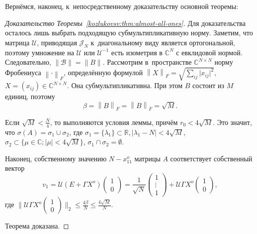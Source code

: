 Верн\"емся, наконец, к~непосредственному доказательству основной теоремы:
\begin{proof}[Доказательство Теоремы~\ref{kozlukovsv:thm:almost-all-ones}]
    Для доказательства осталось лишь выбрать подходящую субмультипликативную норму.
    Заметим, что матрица \( \mathcal{U} \),
    приводящая \( \mathcal{J}_N \) к~диагональному виду
    является ортогональной,
    поэтому умножение на \( \mathcal{U} \) или \(\mathcal{U}^{-1}\)
    есть изометрия в \( \mathbb{C}^N \) с евклидовой нормой.
    Следовательно, \( \|\mathcal{B}\|=\|B\| \).
    Рассмотрим в~пространстве \( \mathbb{C}^{N{\times}N} \)
    норму Фробениуса \( {\left\|\cdot\right\|}_{F} \),
    определ\"енную формулой
    \( {\left\|X\right\|}_{F} = \sqrt{\sum_{ij} \lvert x_{ij}\rvert^2}, \)
    \( X = (x_{ij})\in\mathbb{C}^{N{\times}N} \).
    Она субмультипликативна.
    При этом
    \( B \) состоит из \( M \) единиц, поэтому
    \[
        \beta = {\left\|B\right\|}_{F} =
        {\left\|B\right\|}_{F} = \sqrt{M}.
        \]
    
    Если
     \( \sqrt{M} < \frac{N}{4} \),
     то выполняются условия леммы,
     прич\"ем \( r_0 < 4\sqrt{M} \).
    Это значит, что
     \( \sigma(A) = \sigma_1 \cup \sigma_2 \),
     где \( \sigma_1 = \{ \lambda_1 \}\subset\mathbb{R}, \lvert \lambda_1 - N \rvert < 4\sqrt{M} \),
     \( \sigma_2 \subset \{ \mu\in\mathbb{C}; \lvert\mu\rvert < 4\sqrt{M} \} \),
     \( \sigma_1 \cap \sigma_2 = \emptyset \).

     Наконец, собственному значению \( N - x_{11}^o \)
     матрицы \( A \)
     соответствует собственный вектор
     \[
         v_1 = \mathcal{U}(E+\Gamma X^o) \begin{pmatrix}1\\0\end{pmatrix}
             = \frac{1}{\sqrt{N}} \begin{pmatrix}1\\ \vdots \\ 1\end{pmatrix}
                 + \mathcal{U}\Gamma X^o \begin{pmatrix}1\\0\end{pmatrix}, \]
     где \( \|\mathcal{U}\Gamma X^o \begin{pmatrix}1\\0\end{pmatrix}\|_2 \leq \frac{4\beta}{N} \leq \frac{4\sqrt{M}}{N} \).

    Теорема доказана.
    \end{proof}
